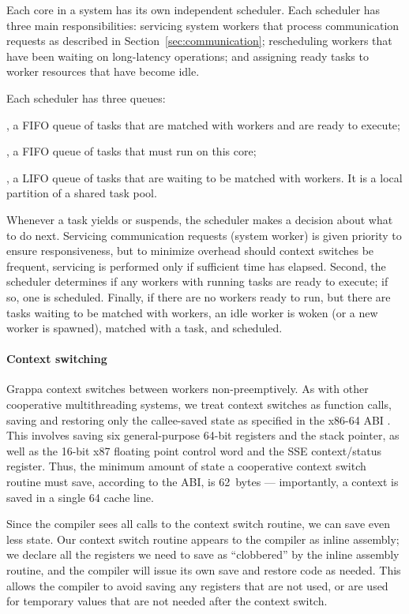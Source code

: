 Each core in a \Grappa system has its own independent scheduler. Each
scheduler has three main responsibilities: servicing system workers that
process communication requests as described in
Section~\ref{sec:communication}; rescheduling workers that have been waiting
on long-latency operations; and assigning ready tasks to worker resources that
have become idle.

Each scheduler has three queues:

, a FIFO queue of tasks that are
  matched with workers and are ready to execute;

, a FIFO queue of tasks that must run on this core;

,  a LIFO queue of tasks that are
  waiting to be matched with workers. It is a local partition of a shared
  task pool.


Whenever a task yields or suspends, the scheduler makes a decision about what
to do next. Servicing communication requests (system worker) is given priority
to ensure responsiveness, but to minimize overhead should context switches be
frequent, servicing is performed only if sufficient time has elapsed. Second,
the scheduler determines if any workers with running tasks are ready to
execute; if so, one is scheduled. Finally, if there are no workers ready to
run, but there are tasks waiting to be matched with workers, an idle worker is
woken (or a new worker is spawned), matched with a task, and scheduled.

\paragraph{Context switching} Grappa context switches between workers
non-preemptively. As with other cooperative multithreading systems, we
treat context switches as function calls, saving and restoring only the
callee-saved state as specified in the x86-64 ABI \cite{amd64:abi:2012}. This
involves saving six general-purpose 64-bit registers and the stack
pointer, as well as the 16-bit x87 floating point control word and the
SSE context/status register. Thus, the minimum amount of state a
cooperative context switch routine must save, according to the ABI, is
62~bytes --- importantly, a context is saved in a single 64 cache line. 

Since the compiler sees all calls to the context switch routine, we
can save even less state. Our context switch routine appears to the
compiler as inline assembly; we declare all the registers we need
to save as ``clobbered'' by the inline assembly routine, and the
compiler will issue its own save and restore code as needed. This allows the
compiler to avoid saving any registers that are not used, or are used
for temporary values that are not needed after the context switch.

